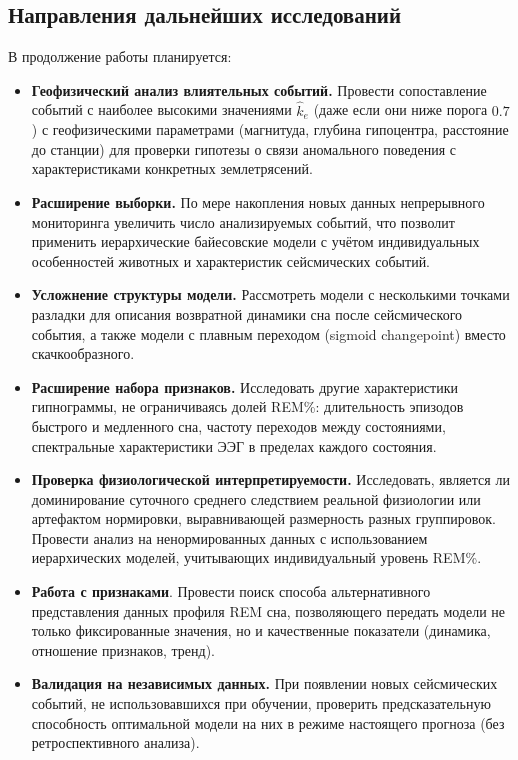 \documentclass[14pt]{mmcs_article}
\begin{document}
	\subsection*{Направления дальнейших исследований}
	
	В продолжение работы планируется:
	
	\begin{itemize}
		\item \textbf{Геофизический анализ влиятельных событий.}
		Провести сопоставление событий с наиболее
		высокими значениями $\hat{k}_e$ (даже если они
		ниже порога $0.7$) с геофизическими параметрами
		(магнитуда, глубина гипоцентра, расстояние до
		станции) для проверки гипотезы о связи
		аномального поведения с характеристиками
		конкретных землетрясений.
		
		\item \textbf{Расширение выборки.}
		По мере накопления новых данных непрерывного
		мониторинга увеличить число анализируемых
		событий, что позволит применить иерархические
		байесовские модели с учётом индивидуальных
		особенностей животных и характеристик
		сейсмических событий.
		
		\item \textbf{Усложнение структуры модели.}
		Рассмотреть модели с несколькими точками
		разладки для описания возвратной динамики сна
		после сейсмического события, а также модели с
		плавным переходом (sigmoid changepoint) вместо
		скачкообразного.
		
		\item \textbf{Расширение набора признаков.}
		Исследовать другие характеристики
		гипнограммы, не ограничиваясь долей REM\%:
		длительность эпизодов быстрого и медленного
		сна, частоту переходов между состояниями,
		спектральные характеристики ЭЭГ в пределах
		каждого состояния.
		
		\item \textbf{Проверка физиологической
			интерпретируемости.}
		Исследовать, является ли доминирование
		суточного среднего следствием реальной
		физиологии или артефактом нормировки,
		выравнивающей размерность разных группировок.
		Провести анализ на ненормированных данных с
		использованием иерархических моделей,
		учитывающих индивидуальный уровень REM\%.
		
		\item \textbf{Работа с признаками}. Провести поиск способа альтернативного представления данных профиля REM сна, позволяющего передать модели не только фиксированные значения, но и качественные показатели (динамика, отношение признаков, тренд).
		
		\item \textbf{Валидация на независимых данных.}
		При появлении новых сейсмических событий,
		не использовавшихся при обучении, проверить
		предсказательную способность оптимальной модели
		на них в режиме настоящего прогноза (без
		ретроспективного анализа).
	\end{itemize}
	\newpage
	
\end{document}
